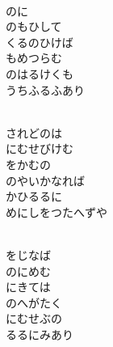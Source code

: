 \documentclass[10pt,b5j]{tarticle} %
\begin{document}
\begin{enumerate}
\begin{minipage}[c]{\blocksize}
    \end{minipage}
    \begin{minipage}[c]{\blocksize}
        
        \vspace{\linespace}
        \item~\\
        のに\\
        のもひして\\
        くるのひけば\\
        もめつらむ\\
        のはるけくも\\
        うちふるふあり
        
    \end{minipage}
    \begin{minipage}[c]{\blocksize}
        
        \vspace{\linespace}
        \item~\\
        されどのは\\
        にむせびけむ\\
        をかむの\\
        のやいかなれば\\
        かひるるに\\
        めにしをつたへずや
        
    \end{minipage}
    \begin{minipage}[c]{\blocksize}
        
        \vspace{\linespace}
        \item~\\
        をじなば\\
        のにめむ\\
        にきては\\
        のへがたく\\
        にむせぶの\\
        るるにみあり
        

\end{minipage}
\end{enumerate}
\end{document}
